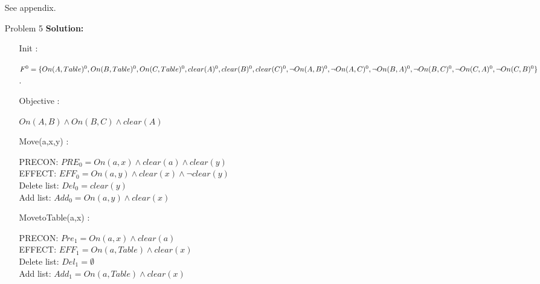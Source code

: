 \normalfont\documentclass[letterpaper,11pt]{article}
\begin{document}
\begin{enumerate}
	See appendix.
\item[Problem 5]\textbf{Solution:}\par
	\begin{enumerate}
		\item[Init]:\par
		$F^0=\{ On(A,Table)^0 , On(B,Table)^0 , On(C,Table)^0 , clear(A)^0 , clear(B)^0 , clear(C)^0 ,\\ \neg On(A,B)^0 , \neg On(A,C)^0, \neg On(B,A)^0, \neg On(B,C)^0 , \neg On(C,A)^0, \neg On(C,B)^0\}$.\\
		\item[Objective]:\par
		$On(A,B)\land On(B,C)\land clear(A)$

		\item[Move(a,x,y)]:\par
		PRECON: $PRE_0 = On(a,x) \land clear(a) \land clear(y)$\\
		EFFECT: $EFF_0 = On(a,y) \land clear(x) \land \neg clear(y)$\\
		Delete list: $Del_0 = clear(y)$\\
		Add list: $Add_0 = On(a,y) \land clear(x)$
		\item[MovetoTable(a,x)]: \par
		PRECON: $Pre_1 = On(a,x) \land clear(a)$\\
		EFFECT: $EFF_1 = On(a,Table) \land clear(x)$\\
		Delete list: $Del_1 = \emptyset$\\
		Add list: $Add_1 = On(a,Table) \land clear(x)$


\end{enumerate}
\end{enumerate}
\end{document}
